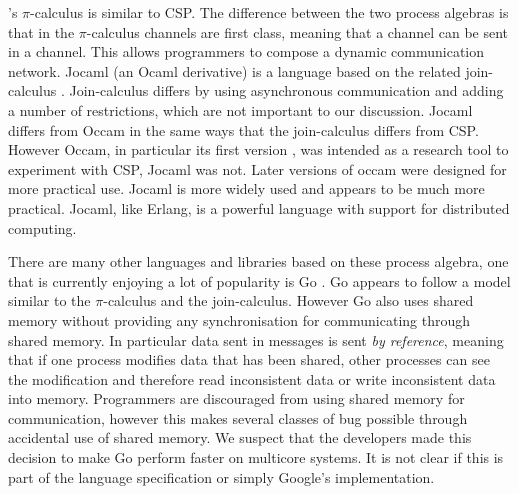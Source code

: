 \citet{milner:pi}'s $\pi$-calculus is similar to CSP.
The difference between the two process algebras is that in the $\pi$-calculus
channels are first class, meaning that a channel can be sent in a channel.
This allows programmers to compose a dynamic communication network.
Jocaml \citep{jocaml} (an Ocaml
\citep{ml-types, ocaml-modules, ocaml-bytecode, ocaml-native}
derivative) is a language based on the related join-calculus
\citep{join-calculas}.
Join-calculus differs by using asynchronous communication and adding a number
of restrictions, which are not important to our discussion.
Jocaml differs from Occam in the same ways that the join-calculus differs
from CSP.
However Occam, in particular its first version \citep{occam1},
was intended as a research tool to experiment with CSP, Jocaml was not.
Later versions of occam \citep{occam3} were designed for more practical use.
Jocaml is more widely used and appears to be much more practical.
Jocaml, like Erlang, is a powerful language with support for distributed
computing.

There are many other languages and libraries based on these process algebra,
one that is currently enjoying a lot of popularity is Go
\citep{balbaert:2012:go}.
Go appears to follow a model similar to the $\pi$-calculus and the
join-calculus.
However Go also uses shared memory without providing any synchronisation
for communicating through shared memory.
In particular data sent in messages is sent \emph{by reference},
meaning that if one process modifies data that has been shared,
other processes can see the modification and therefore read inconsistent data
or write inconsistent data into memory.
Programmers are discouraged from using shared memory for communication,
however this makes several classes of bug possible through accidental use of
shared memory.
We suspect that the developers made this decision to make Go perform faster on
multicore systems.
It is not clear if this is part of the language specification or simply
Google's implementation.

